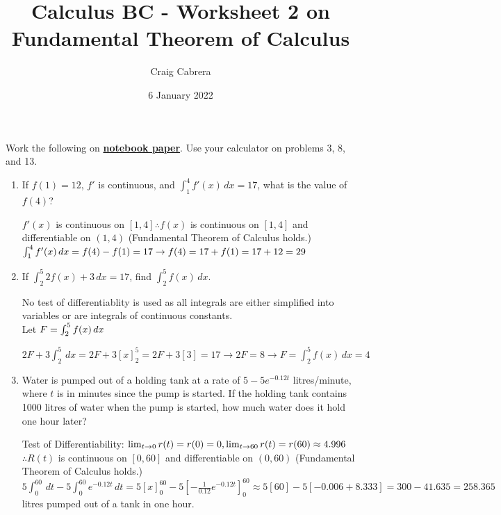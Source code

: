 \documentclass[10pt, letterpaper]{report}
\title{Calculus BC - Worksheet 2 on Fundamental Theorem of Calculus}
\author{Craig Cabrera}
\date{6 January 2022}
\begin{document}
\maketitle
Work the following on \textbf{\underline{notebook paper}}. Use your calculator on problems 3, 8, and 13.
\begin{enumerate}
	\item{If $f(1)=12$, $f'$ is continuous, and $\int_{1}^{4}{f'(x)}\,dx=17$, what is the value of $f(4)$? \\}

		$f'(x)$ is continuous on $[1,4] \therefore f(x)$ is continuous on $[1,4]$ and differentiable on $(1,4)$ (Fundamental Theorem of Calculus holds.) \\

		$\int_{1}^{4}{f'(x)}\,dx=
		f(4)-f(1)=17\rightarrow
		f(4)=17+f(1)=17+12=29 \\$

	\item{If $\int_{2}^{5}{2f(x)+3}\,dx=17$, find $\int_{2}^{5}{f(x)}\,dx$. \\}

    No test of differentiablity is used as all integrals are either simplified into variables or are integrals of continuous constants. \\

		Let $F=\int_{2}^{5}{f(x)}\,dx \\$

		$2F+3\int_{2}^{5}\,dx=
		2F+3[x]_{2}^{5}=
		2F+3[3]=17\rightarrow
		2F=8\rightarrow F=\int_{2}^{5}{f(x)}\,dx=4$ \\

	\item{Water is pumped out of a holding tank at a rate of $5-5e^{-0.12t}$ litres/minute, where $t$ is in minutes since the pump is started. If the holding tank contains 1000 litres of water when the pump is started, how much water does it hold one hour later? \\}

		Test of Differentiability:
		$\lim_{t\to 0}r(t)=r(0)=0,
		\lim_{t\to 60}r(t)=r(60)\approx4.996 \\$
		$\therefore R(t)$ is continuous on $[0,60]$ and differentiable on $(0,60)$ (Fundamental Theorem of Calculus holds.) \\

		$5\int_{0}^{60}\,dt-5\int_{0}^{60}{e^{-0.12t}}\,dt=
		5[x]_{0}^{60}-5[-\frac{1}{0.12}e^{-0.12t}]_{0}^{60}\approx
		5[60]-5[-0.006+8.333]=300-41.635=258.365$ litres pumped out of a tank in one hour. \\


\end{enumerate}
\end{document}

